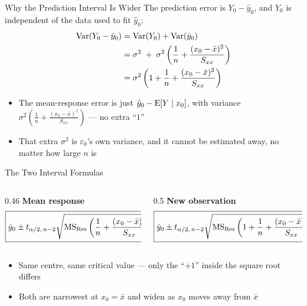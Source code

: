 \begin{frame}{Why the Prediction Interval Is Wider}
	The prediction error is $Y_0-\hat y_0$, and $Y_0$ is independent of the data used to fit $\hat y_0$:
	\begin{align*}
		\operatorname{Var}(Y_0-\hat y_0) &= \operatorname{Var}(Y_0) + \operatorname{Var}(\hat y_0)\\
		&= \sigma^2 \;+\; \sigma^2\left(\frac1n+\frac{(x_0-\bar x)^2}{S_{xx}}\right)\\
		&= \sigma^2\left(1+\frac1n+\frac{(x_0-\bar x)^2}{S_{xx}}\right)
	\end{align*}
	\begin{itemize}
		\item The mean-response error is just $\hat y_0 - \operatorname{E}[Y\mid x_0]$, with variance $\sigma^2\!\left(\frac1n+\frac{(x_0-\bar x)^2}{S_{xx}}\right)$ --- no extra ``$1$''
		\item That extra $\sigma^2$ is $\varepsilon_0$'s own variance, and it cannot be estimated away, no matter how large $n$ is
	\end{itemize}
\end{frame}


\begin{frame}{The Two Interval Formulas}
	\begin{columns}[T]
		\begin{column}{0.46\textwidth}
			\centering \small \textbf{Mean response}
			\[
				\boxed{\hat y_0 \pm t_{\alpha/2,\,n-2}\sqrt{\mathrm{MS}_{\mathrm{Res}}\left(\frac1n+\frac{(x_0-\bar x)^2}{S_{xx}}\right)}}
			\]
		\end{column}
		\begin{column}{0.5\textwidth}
			\centering \small \textbf{New observation}
			\[
				\boxed{\hat y_0 \pm t_{\alpha/2,\,n-2}\sqrt{\mathrm{MS}_{\mathrm{Res}}\left(1+\frac1n+\frac{(x_0-\bar x)^2}{S_{xx}}\right)}}
			\]
		\end{column}
	\end{columns}
	\svspace{1em}
	\begin{itemize}
		\item Same centre, same critical value --- only the ``$+1$'' inside the square root differs
		\item Both are narrowest at $x_0=\bar x$ and widen as $x_0$ moves away from $\bar x$
	\end{itemize}
\end{frame}


